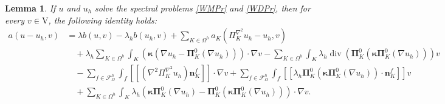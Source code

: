 \documentclass[final,reqno]{elsarticle}
\newtheorem{lemma}{Lemma}[section]
\newcommand\vdiv{\mathop{\mathrm{div}}\nolimits}
\newcommand\cF{\mathcal{F}}
\newcommand{\jump}[1]{[\![#1]\!]}
\def\bn{\boldsymbol{n}}
\def\bkappa{\boldsymbol{\kappa}}
\def\bPi{\mathbf{\Pi}}
\def\rV{\mathrm{V}}
\begin{document}
\begin{lemma}\label{Lem13ApVEP}
    If  $u$ and $u_h$ solve the spectral problems \eqref{WMPr} and \eqref{WDPr}, then for every $v\in  \rV$, the following identity holds:
    \begin{align*}
        a(u-u_h,v) &= \lambda b(u,v)-\lambda_h b( u_h,v) + \sum_{K\in \Omega^h} a_K(\Pi_K^{\nabla^2} u_h-u_h,v) \\
        &\quad + \lambda_h \sum_{K\in \Omega^h} \int_K (\bkappa(\nabla u_h - \bPi_K^0 (\nabla u_h)))\cdot \nabla v - \sum_{K\in \Omega^h} \int_{K}\lambda_h \vdiv\left( \bPi_K^0 (\bkappa \bPi_K^0(\nabla u_h))\right) v \\
        &\quad - \sum_{f\in \cF^h_\Omega} \int_f \jump{(\nabla^2\Pi_K^{\nabla^2} u_h )\bn_K^f}\cdot \nabla v + \sum_{f\in \mathcal{F}^h_\Omega} \int_f
        \jump{\lambda_h\bPi_K^0(\bkappa \bPi_K^0(\nabla u_h ))\cdot \bn_K^{f}}v \\
        &\quad + \sum_{K\in \Omega^h}\int_K \lambda_h \left(\bkappa \bPi_K^0(\nabla u_h)-\bPi_K^0(\bkappa \bPi_K^0(\nabla u_h))\right) \cdot \nabla v.
    \end{align*}
\end{lemma}
\end{document}
